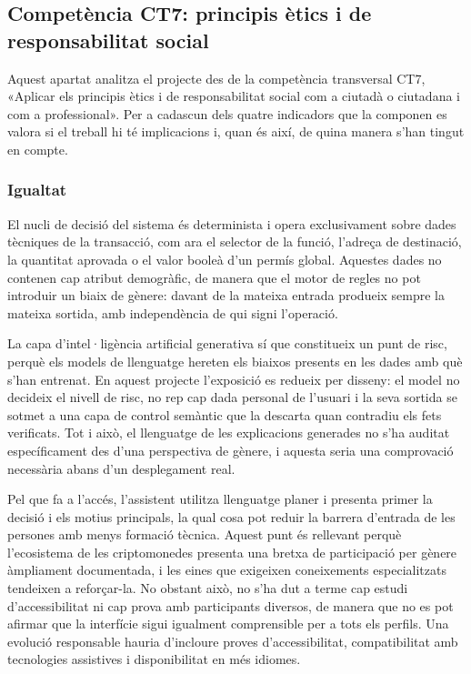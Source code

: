 \subsection{Competència CT7: principis ètics i de responsabilitat social}

Aquest apartat analitza el projecte des de la competència transversal CT7, «Aplicar els principis ètics i de responsabilitat social com a ciutadà o ciutadana i com a professional». Per a cadascun dels quatre indicadors que la componen es valora si el treball hi té implicacions i, quan és així, de quina manera s'han tingut en compte.

\subsubsection{Igualtat}

El nucli de decisió del sistema és determinista i opera exclusivament sobre dades tècniques de la transacció, com ara el selector de la funció, l'adreça de destinació, la quantitat aprovada o el valor booleà d'un permís global. Aquestes dades no contenen cap atribut demogràfic, de manera que el motor de regles no pot introduir un biaix de gènere: davant de la mateixa entrada produeix sempre la mateixa sortida, amb independència de qui signi l'operació.

La capa d'intel·ligència artificial generativa sí que constitueix un punt de risc, perquè els models de llenguatge hereten els biaixos presents en les dades amb què s'han entrenat. En aquest projecte l'exposició es redueix per disseny: el model no decideix el nivell de risc, no rep cap dada personal de l'usuari i la seva sortida se sotmet a una capa de control semàntic que la descarta quan contradiu els fets verificats. Tot i això, el llenguatge de les explicacions generades no s'ha auditat específicament des d'una perspectiva de gènere, i aquesta seria una comprovació necessària abans d'un desplegament real.

Pel que fa a l'accés, l'assistent utilitza llenguatge planer i presenta primer la decisió i els motius principals, la qual cosa pot reduir la barrera d'entrada de les persones amb menys formació tècnica. Aquest punt és rellevant perquè l'ecosistema de les criptomonedes presenta una bretxa de participació per gènere àmpliament documentada, i les eines que exigeixen coneixements especialitzats tendeixen a reforçar-la. No obstant això, no s'ha dut a terme cap estudi d'accessibilitat ni cap prova amb participants diversos, de manera que no es pot afirmar que la interfície sigui igualment comprensible per a tots els perfils. Una evolució responsable hauria d'incloure proves d'accessibilitat, compatibilitat amb tecnologies assistives i disponibilitat en més idiomes.

